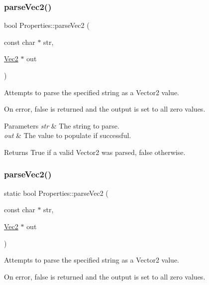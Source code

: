 \subsubsection{\texorpdfstring{parse\+Vec2()}{parseVec2()}\hspace{0.1cm}{\footnotesize\ttfamily [1/2]}}
{\footnotesize\ttfamily bool Properties\+::parse\+Vec2 (\begin{DoxyParamCaption}\item[{const char $\ast$}]{str,  }\item[{\hyperlink{classVec2}{Vec2} $\ast$}]{out }\end{DoxyParamCaption})\hspace{0.3cm}{\ttfamily [static]}}

Attempts to parse the specified string as a Vector2 value.

On error, false is returned and the output is set to all zero values.


\begin{DoxyParams}{Parameters}
{\em str} & The string to parse. \\
\hline
{\em out} & The value to populate if successful.\\
\hline
\end{DoxyParams}
\begin{DoxyReturn}{Returns}
True if a valid Vector2 was parsed, false otherwise. 
\end{DoxyReturn}
\mbox{\label{classProperties_ae6061fa183ad471f12164697110ace6d}} 
\subsubsection{\texorpdfstring{parse\+Vec2()}{parseVec2()}\hspace{0.1cm}{\footnotesize\ttfamily [2/2]}}
{\footnotesize\ttfamily static bool Properties\+::parse\+Vec2 (\begin{DoxyParamCaption}\item[{const char $\ast$}]{str,  }\item[{\hyperlink{classVec2}{Vec2} $\ast$}]{out }\end{DoxyParamCaption})\hspace{0.3cm}{\ttfamily [static]}}

Attempts to parse the specified string as a Vector2 value.

On error, false is returned and the output is set to all zero values.


